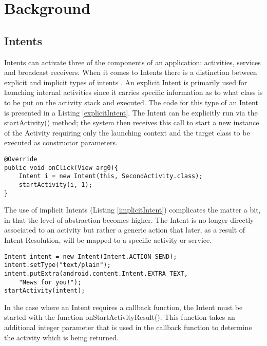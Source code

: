 \section{Background}
\label{background}

\subsection{Intents} 
\label{intents}
Intents can activate three of the components of an application: activities, services and broadcast receivers.
When it comes to Intents there is a distinction between explicit and implicit types of intents \cite{intent}.
An explicit Intent is primarily used for launching internal activities since it carries specific information as to what class is to be put on the activity stack and executed. The code for this type of an Intent is presented in a Listing \ref{explicitIntent}. The Intent can be explicitly run via the startActivity() method; the system then receives this call to start a new instance of the Activity requiring only the launching context and the target class to be executed as constructor parameters.

\footnotesize\begin{lstlisting}[label=explicitIntent,caption=Explicit Intent]
@Override
public void onClick(View arg0){
    Intent i = new Intent(this, SecondActivity.class);
    startActivity(i, 1);
}
\end{lstlisting}

The use of implicit Intents (Listing \ref{implicitIntent}) complicates the matter a bit, in that the level of abstraction becomes higher. The Intent is no longer directly associated to an activity but rather a generic action that later, as a result of Intent Resolution, will be mapped to a specific activity or service.

{\footnotesize\begin{lstlisting}[label=implicitIntent,caption=Implicit Intent]
Intent intent = new Intent(Intent.ACTION_SEND);
intent.setType("text/plain");
intent.putExtra(android.content.Intent.EXTRA_TEXT, 
	"News for you!");
startActivity(intent);
\end{lstlisting}}

In the case where an Intent requires a callback function, the Intent must be started with the function onStartActivityResult(). This function takes an additional integer parameter that is used in the callback function to determine the activity which is being returned.


